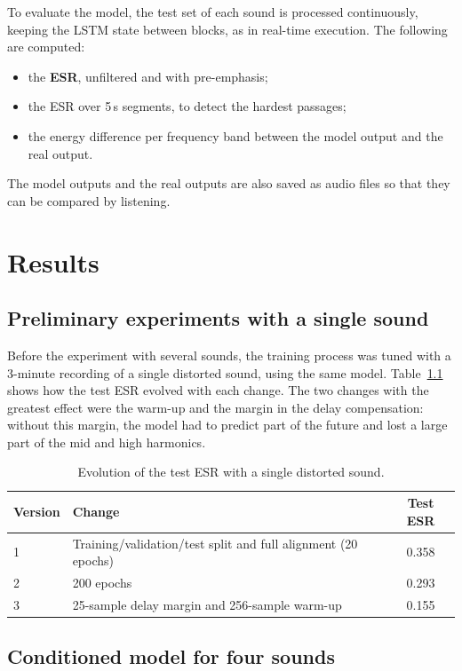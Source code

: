 \documentclass[ENG]{TFUOC}%
\begin{document}
To evaluate the model, the test set of each sound is processed continuously, keeping the LSTM state between blocks, as in real-time execution. The following are computed:
\begin{itemize}[nosep]
    \item the \textbf{ESR}, unfiltered and with pre-emphasis;
    \item the ESR over 5\,s segments, to detect the hardest passages;
    \item the energy difference per frequency band between the model output and the real output.
\end{itemize}
The model outputs and the real outputs are also saved as audio files so that they can be compared by listening.

\chapter{Results}
\label{c:resultats}

\section{Preliminary experiments with a single sound}

Before the experiment with several sounds, the training process was tuned with a 3-minute recording of a single distorted sound, using the same model. Table~\ref{tab:evolucio} shows how the test ESR evolved with each change. The two changes with the greatest effect were the warm-up and the margin in the delay compensation: without this margin, the model had to predict part of the future and lost a large part of the mid and high harmonics.

\begin{table}[H]
\centering
\caption{Evolution of the test ESR with a single distorted sound.}
\label{tab:evolucio}
\small
\begin{tabularx}{\textwidth}{lXc}
\toprule
\textbf{Version} & \textbf{Change} & \textbf{Test ESR} \\
\midrule
1 & Training/validation/test split and full alignment (20 epochs) & 0.358 \\
2 & 200 epochs & 0.293 \\
3 & 25-sample delay margin and 256-sample warm-up & 0.155 \\
\bottomrule
\end{tabularx}
\end{table}

\section{Conditioned model for four sounds}
\end{document}
